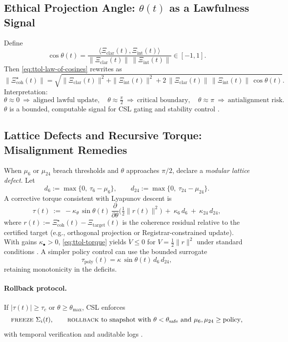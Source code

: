 \documentclass[12pt]{amsart}
\theoremstyle{plain}
\begin{document}
\subsection{Ethical Projection Angle: $\theta(t)$ as a Lawfulness Signal}
Define
\[
\cos\theta(t)=\frac{\langle \Xi_{\mathrm{clar}}(t),\Xi_{\mathrm{int}}(t)\rangle}
{\|\Xi_{\mathrm{clar}}(t)\|\,\|\Xi_{\mathrm{int}}(t)\|}\in[-1,1].
\]
Then \eqref{eq:ttol-law-of-cosines} rewrites as
\[
\|\Xi_{\mathrm{coh}}^{\star}(t)\|
=\sqrt{\|\Xi_{\mathrm{clar}}(t)\|^{2}+\|\Xi_{\mathrm{int}}(t)\|^{2}
+2\,\|\Xi_{\mathrm{clar}}(t)\|\,\|\Xi_{\mathrm{int}}(t)\|\,\cos\theta(t)}.
\]
Interpretation:
\[
\theta\approx 0\ \Rightarrow\ \text{aligned lawful update},\quad
\theta\approx \tfrac{\pi}{2}\ \Rightarrow\ \text{critical boundary},\quad
\theta\approx \pi\ \Rightarrow\ \text{antialignment risk}.
\]
$\theta$ is a bounded, computable signal for CSL gating and stability control \cite{rudin1991functional,khalil2002nonlinear}.

\subsection{Lattice Defects and Recursive Torque: Misalignment Remedies}
When $\mu_6$ or $\mu_{24}$ breach thresholds and $\theta$ approaches $\pi/2$, declare a \emph{modular lattice defect}. Let
\[
d_6:=\max\{0,\ \tau_6-\mu_6\},\qquad d_{24}:=\max\{0,\ \tau_{24}-\mu_{24}\}.
\]
A corrective torque consistent with Lyapunov descent is
\begin{equation}
\tau(t)\ :=\ -\kappa_\theta\,\sin\theta(t)\,\frac{\partial}{\partial \theta}
\Big(\tfrac12\|r(t)\|^2\Big)\ +\ \kappa_6\,d_6\ +\ \kappa_{24}\,d_{24},
\label{eq:ttol-torque}
\end{equation}
where $r(t):=\Xi_{\mathrm{coh}}^{\star}(t)-\Xi_{\mathrm{target}}(t)$ is the coherence residual relative to the certified target (e.g., orthogonal projection or Registrar-constrained update). With gains $\kappa_\bullet>0$, \eqref{eq:ttol-torque} yields $\dot V\le 0$ for $V=\tfrac12\|r\|^2$ under standard conditions \cite{khalil2002nonlinear}. A simpler policy control can use the bounded surrogate
\[
\tau_{\mathrm{poly}}(t)=\kappa\,\sin\theta(t)\,d_6\,d_{24},
\]
retaining monotonicity in the deficits.

\paragraph{Rollback protocol.}
If $|\tau(t)|\ge \tau_c$ or $\theta\ge \theta_{\max}$, CSL enforces
\[
\textsc{freeze}\ \Sigma_i(t),\qquad
\textsc{rollback}\ \text{to snapshot with }\theta<\theta_{\mathrm{safe}}\ \text{and}\ \mu_6,\mu_{24}\ge \text{policy},
\]
with temporal verification and auditable logs \cite{clarke1999model,baier2008model,schneider2000enforceable}.
\end{document}
